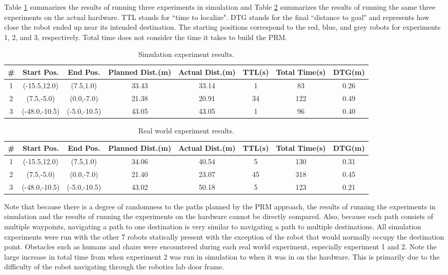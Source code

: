 \documentclass[11pt]{article}
\begin{document}
Table \ref{tab:simresults} summarizes the results of running three experiments in simulation and Table \ref{tab:realresults} summarizes the results of running the same three experiments on the actual hardware. TTL stands for ``time to localize". DTG stands for the final ``distance to goal" and represents how close the robot ended up near its intended destination. The starting positions correspond to the red, blue, and grey robots for experiments 1, 2, and 3, respectively. Total time does not consider the time it takes to build the PRM. \\

\begin{table}[h]
\footnotesize
\centering
\begin{tabular}{| c | c | c | c | c | c | c | c |}
\hline
{\#} & Start Pos. & End Pos. & Planned Dist.(m) & Actual Dist.(m) & TTL(s) & Total Time(s) & DTG(m) \\
\hline 
1 & (-15.5,12.0) & (7.5,1.0) & 33.43 & 33.14 & 1 & 83 & 0.26 \\
\hline 
2 & (7.5,-5.0) & (0.0,-7.0) & 21.38 & 20.91 & 34 & 122 & 0.49 \\
\hline 
3 & (-48.0,-10.5) & (-5.0,-10.5) & 43.05 & 43.05 & 1 & 96 & 0.40 \\
\hline
\end{tabular}
\caption{Simulation experiment results.}
\label{tab:simresults}
\end{table}

\begin{table}[h]
\footnotesize
\centering
\begin{tabular}{| c | c | c | c | c | c | c | c |}
\hline
{\#} & Start Pos. & End Pos. & Planned Dist.(m) & Actual Dist.(m) & TTL(s) & Total Time(s) & DTG(m) \\
\hline 
1 & (-15.5,12.0) & (7.5,1.0) & 34.06 & 40.54 & 5 & 130 & 0.31 \\
\hline 
2 & (7.5,-5.0) & (0.0,-7.0) & 21.40 & 23.07 & 45 & 318 & 0.45 \\
\hline 
3 & (-48.0,-10.5) & (-5.0,-10.5) & 43.02 & 50.18 & 5 & 123 & 0.21 \\
\hline

\end{tabular}
\caption{Real world experiment results.}
\label{tab:realresults}
\end{table}

Note that because there is a degree of randomness to the paths planned by the PRM approach, the results of running the experiments in simulation and the results of running the experiments on the hardware cannot be directly compared. Also, because each path consists of multiple waypoints, navigating a path to one destination is very similar to navigating a path to multiple destinations. All simulation experiments were run with the other 7 robots statically present with the exception of the robot that would normally occupy the destination point. Obstacles such as humans and chairs were encountered during each real world experiment, especially experiment 1 and 2. Note the large increase in total time from when experiment 2 was run in simulation to when it was in on the hardware. This is primarily due to the difficulty of the robot navigating through the robotics lab door frame. 
\end{document}
